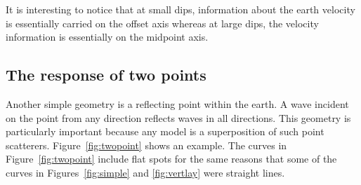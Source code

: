\par
It is interesting to notice that at small dips,
information about the earth velocity is essentially carried
on the offset axis whereas at large dips,
the velocity information is essentially on the midpoint axis.

\subsection{The response of two points}
\par
Another simple geometry is a reflecting point within the earth.
A wave incident on the point from any direction
reflects waves in all directions.
This geometry is particularly important because
any model is a superposition of such point scatterers.
Figure~\ref{fig:twopoint} shows an example.
\newslide
The curves in Figure~\ref{fig:twopoint}
include flat spots for the same reasons
that some of the curves in Figures~\ref{fig:simple} and \ref{fig:vertlay}
were straight lines.

\newslide

